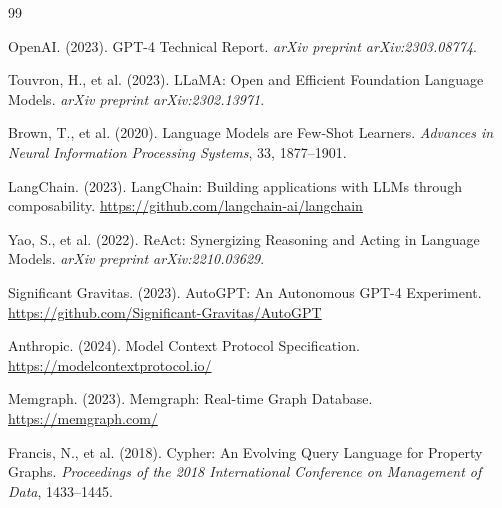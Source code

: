 \documentclass[a4paper,twoside]{sapthesis}
\begin{document}
\cleardoublepage
{}  %



\begin{thebibliography}{99}

OpenAI. (2023). GPT-4 Technical Report. \textit{arXiv preprint arXiv:2303.08774}.

Touvron, H., et al. (2023). LLaMA: Open and Efficient Foundation Language Models. \textit{arXiv preprint arXiv:2302.13971}.

Brown, T., et al. (2020). Language Models are Few-Shot Learners. \textit{Advances in Neural Information Processing Systems}, 33, 1877--1901.

LangChain. (2023). LangChain: Building applications with LLMs through composability. \url{https://github.com/langchain-ai/langchain}

Yao, S., et al. (2022). ReAct: Synergizing Reasoning and Acting in Language Models. \textit{arXiv preprint arXiv:2210.03629}.

Significant Gravitas. (2023). AutoGPT: An Autonomous GPT-4 Experiment. \url{https://github.com/Significant-Gravitas/AutoGPT}

Anthropic. (2024). Model Context Protocol Specification. \url{https://modelcontextprotocol.io/}

Memgraph. (2023). Memgraph: Real-time Graph Database. \url{https://memgraph.com/}

Francis, N., et al. (2018). Cypher: An Evolving Query Language for Property Graphs. \textit{Proceedings of the 2018 International Conference on Management of Data}, 1433--1445.


\end{thebibliography}
\end{document}
